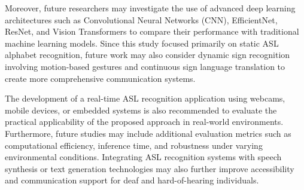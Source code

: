 Moreover, future researchers may investigate the use of advanced deep learning architectures such as Convolutional Neural Networks (CNN), EfficientNet, ResNet, and Vision Transformers to compare their performance with traditional machine learning models. Since this study focused primarily on static ASL alphabet recognition, future work may also consider dynamic sign recognition involving motion-based gestures and continuous sign language translation to create more comprehensive communication systems.

The development of a real-time ASL recognition application using webcams, mobile devices, or embedded systems is also recommended to evaluate the practical applicability of the proposed approach in real-world environments. Furthermore, future studies may include additional evaluation metrics such as computational efficiency, inference time, and robustness under varying environmental conditions. Integrating ASL recognition systems with speech synthesis or text generation technologies may also further improve accessibility and communication support for deaf and hard-of-hearing individuals.